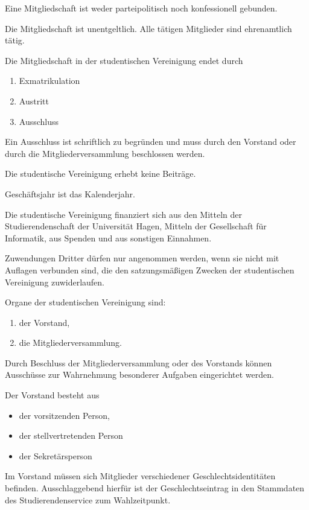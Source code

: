 \begin{contract}
Eine Mitgliedschaft ist weder parteipolitisch noch konfessionell gebunden.

Die Mitgliedschaft ist unentgeltlich. Alle tätigen Mitglieder sind ehrenamtlich tätig.

\label{sec:mitgliedschaftsende}

Die Mitgliedschaft in der studentischen Vereinigung endet durch
\begin{enumerate}
    \item Exmatrikulation
    \item Austritt
    \item Ausschluss
\end{enumerate}
Ein Ausschluss ist schriftlich zu begründen und muss durch den Vorstand oder durch die Mitgliederversammlung beschlossen werden.

\label{sec:beiträge}

Die studentische Vereinigung erhebt keine Beiträge.


\label{sec:geschäftsjahr}

Geschäftsjahr ist das Kalenderjahr.


Die studentische Vereinigung finanziert sich aus den Mitteln der Studierendenschaft der Universität Hagen, Mitteln der Gesellschaft für Informatik, aus Spenden und aus sonstigen Einnahmen.

Zuwendungen Dritter dürfen nur angenommen werden, wenn sie nicht mit Auflagen verbunden sind, die den satzungsmäßigen Zwecken der studentischen Vereinigung zuwiderlaufen.


\label{sec:organe}

Organe der studentischen Vereinigung sind:
\begin{enumerate}
    \item der Vorstand,
    \item die Mitgliederversammlung.
\end{enumerate}
Durch Beschluss der Mitgliederversammlung oder des Vorstands können Ausschüsse zur Wahrnehmung besonderer Aufgaben eingerichtet werden.


\label{sec:vorstand}


Der Vorstand besteht aus 
\begin{itemize}
    \item der vorsitzenden Person,
    \item der stellvertretenden Person
    \item der Sekretärsperson
\end{itemize}  \label{sec:vorstand-posten}
Im Vorstand müssen sich Mitglieder verschiedener Geschlechtsidentitäten befinden. Ausschlaggebend hierfür ist der Geschlechtseintrag in den Stammdaten des Studierendenservice zum Wahlzeitpunkt.


\end{contract}
